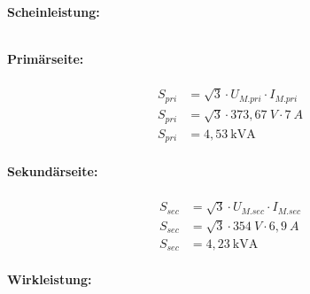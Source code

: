 \begin{enumerate}[label=\alph*)]
	      \textbf{Scheinleistung:}\\ \ \\
	      \begin{tcolorbox}[colback=gray!30,
			      colframe=black,
			      width=0.9\textwidth,
		      ]
		      \parbox{\textwidth}{

			      \begin{minipage}{0.5\textwidth}
				      \textbf{Primärseite:}\\ \ \\
				      \begin{align*}
					      S_{pri} & = \sqrt3\cdot U_{M.pri}\cdot I_{M.pri} \\
					      S_{pri} & = \sqrt3\cdot 373,67\ V\cdot 7\ A      \\
					      S_{pri} & = 4,53\ \text{kVA}                     \\
				      \end{align*}
			      \end{minipage}\hfill
			      \begin{minipage}{0.5\textwidth}
				      \textbf{Sekundärseite:}\\ \ \\
				      \begin{align*}
					      S_{sec} & = \sqrt3\cdot U_{M.sec}\cdot I_{M.sec} \\
					      S_{sec} & = \sqrt3\cdot 354\ V\cdot 6,9\ A       \\
					      S_{sec} & = 4,23\ \text{kVA}                     \\
				      \end{align*}
			      \end{minipage}
		      }
	      \end{tcolorbox}

	      \pagebreak
	      \textbf{Wirkleistung:}\\ \ \\
	      \begin{tcolorbox}[colback=gray!30,
			      colframe=black,
			      width=0.9\textwidth,
		      ]
		      \parbox{\textwidth}{

}
\end{tcolorbox}
\end{enumerate}
